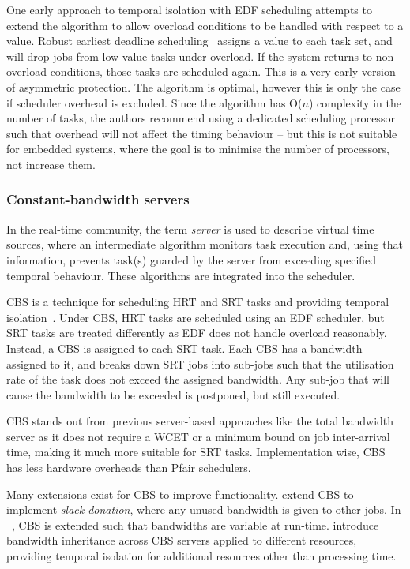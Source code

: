 One early approach to temporal isolation with \gls{EDF} scheduling attempts to extend the 
algorithm to allow overload conditions to be handled with respect to a value. Robust earliest deadline
scheduling~\citep{Buttazzo_Stankovic_93} assigns a value to each task set, and will drop jobs from
low-value tasks under overload. If the system returns to non-overload conditions, those tasks are
scheduled again. This is a very early version of asymmetric protection.
The algorithm is optimal, however this is only the case if
scheduler overhead is excluded.  Since the algorithm has O($n$) complexity in the number of
tasks, the authors recommend using a dedicated scheduling processor such that overhead will not
affect the timing behaviour -- but this is not suitable for embedded systems, where the goal is to
minimise the number of processors, not increase them.

\subsubsection{Constant-bandwidth servers}

In the real-time community, the term \emph{server} is used to describe virtual time sources, where
an intermediate algorithm monitors task execution and, using that information, prevents task(s)
guarded by the server from exceeding specified temporal behaviour. These algorithms are integrated
into the scheduler.

\Gls{CBS} is a technique for scheduling \gls{HRT} and
\gls{SRT} tasks and providing temporal isolation~\citep{Abeni_Buttazzo_04}. Under \gls{CBS}, \gls{HRT} tasks are scheduled using an \gls{EDF}
scheduler, but \gls{SRT} tasks are treated differently as \gls{EDF} does not handle overload
reasonably.
Instead, a \gls{CBS} is assigned to each \gls{SRT} task.  Each \gls{CBS} has a bandwidth assigned to
it, and breaks down \gls{SRT} jobs into sub-jobs such that the utilisation rate of the task does not
exceed the assigned bandwidth.  Any sub-job that will cause the bandwidth to be exceeded is
postponed, but still executed.

\gls{CBS} stands out from previous server-based approaches like the total bandwidth
server\citep{Spuri_Buttazzo_94} as it does not require a \gls{WCET} or a minimum
bound on job inter-arrival time, making it much more suitable for \gls{SRT} tasks.  Implementation
wise, \gls{CBS} has less hardware overheads than Pfair schedulers.

Many extensions exist for \gls{CBS} to improve functionality.  \citet{Kato_IR_11} extend \gls{CBS} to
implement \emph{slack donation}, where any unused bandwidth is given to other jobs.  In
~\citep{Craciunas_KPRS_12}, \gls{CBS} is extended such that bandwidths are variable at run-time.
\citet{Lamastra_LA_01} introduce bandwidth inheritance across CBS servers applied to different
resources, providing temporal isolation for additional resources other than processing time.

